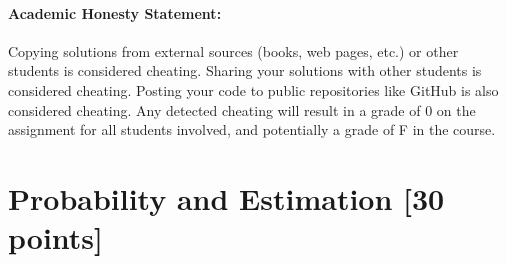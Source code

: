 \documentclass[letterpaper]{article}
\begin{document}
\paragraph*{Academic Honesty Statement:} Copying solutions from external sources (books, web pages, etc.) or other students is considered cheating. Sharing your solutions with other students is  considered cheating. Posting your code to public repositories like GitHub is also considered cheating. Any detected cheating will result in a grade of 0 on the assignment for all students involved, and potentially a grade of F in the course.\\


\section{Probability and Estimation [30 points]}
\end{document}
